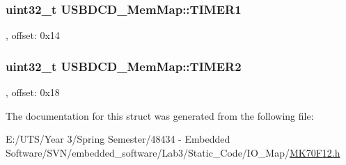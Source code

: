 \subsubsection[{T\+I\+M\+E\+R1}]{\setlength{\rightskip}{0pt plus 5cm}uint32\+\_\+t U\+S\+B\+D\+C\+D\+\_\+\+Mem\+Map\+::\+T\+I\+M\+E\+R1}\label{struct_u_s_b_d_c_d___mem_map_aa8bcdbeba3cbd7a27281d317ba5484e9}
, offset\+: 0x14 \hypertarget{struct_u_s_b_d_c_d___mem_map_abaa84a33ed5173cf08f87f3590a3f035}{}
\subsubsection[{T\+I\+M\+E\+R2}]{\setlength{\rightskip}{0pt plus 5cm}uint32\+\_\+t U\+S\+B\+D\+C\+D\+\_\+\+Mem\+Map\+::\+T\+I\+M\+E\+R2}\label{struct_u_s_b_d_c_d___mem_map_abaa84a33ed5173cf08f87f3590a3f035}
, offset\+: 0x18 

The documentation for this struct was generated from the following file\+:\begin{DoxyCompactItemize}
\item 
E\+:/\+U\+T\+S/\+Year 3/\+Spring Semester/48434 -\/ Embedded Software/\+S\+V\+N/embedded\+\_\+software/\+Lab3/\+Static\+\_\+\+Code/\+I\+O\+\_\+\+Map/\hyperlink{_m_k70_f12_8h}{M\+K70\+F12.\+h}\end{DoxyCompactItemize}
